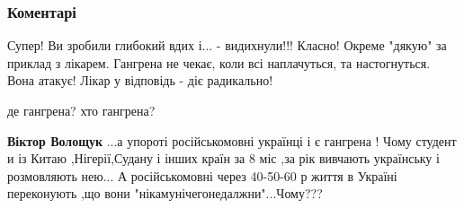  
 
 
 
 
\subsubsection{Коментарі}
\label{sec:08_07_2021.fb.nicoj_larisa.1.podrostki_jazyk_mova.cmt}

\begin{itemize}
 
\obeycr
Супер!
Ви зробили глибокий вдих і... -
видихнули!!!
Класно!
Окреме "дякую" за приклад з лікарем.
Гангрена не чекає, коли всі наплачуться, та настогнуться.
Вона атакує! Лікар у відповідь - діє радикально!
\restorecr

\begin{itemize}
 
де гангрена? хто гангрена?

\begin{itemize}

 
\textbf{Віктор Волощук} ...а упороті російськомовні українці і є гангрена !
Чому студент и із Китаю ,Нігерії,Судану і інших країн за 8 міс ,за рік вивчають
українську і розмовляють нею... А російськомовні через 40-50-60 р життя в
Україні переконують ,що вони "нікамунічегонедалжни"...Чому???

 

\end{itemize}
\end{itemize}
\end{itemize}
